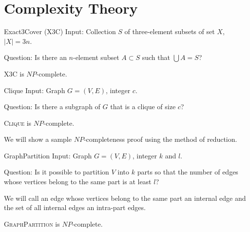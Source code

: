 \section{Complexity Theory}



\begin{problem}{Exact3Cover (X3C)}
	Input: Collection $S$ of three-element subsets of set $X$, $\vert{X}\vert = 3n$.

	Question: Is there an $n$-element subset $A \subset S$ such that $\bigcup A = S$?
\end{problem}

\begin{thm}
\textsc{X3C} is $NP$-complete.
\end{thm}


\begin{problem}{Clique}
    Input: Graph $G = (V, E)$, integer $c$.

    Question: Is there a subgraph of $G$ that is a clique of size $c$?
\end{problem}

\begin{thm}
\textsc{Clique} is $NP$-complete.
\end{thm}


We will show a sample $NP$-completeness proof using the method of reduction.

\begin{problem}{GraphPartition}
Input: Graph $G = (V, E)$, integer $k$ and $l$.

Question: Is it possible to partition $V$ into $k$ parts so that the number of edges
whose vertices belong to the same part is at least $l$?
\end{problem}

We will call an edge whose vertices belong to the same part an internal edge
and the set of all internal edges an intra-part edges.

\begin{thm}
\textsc{GraphPartition} is $NP$-complete.
\end{thm}


